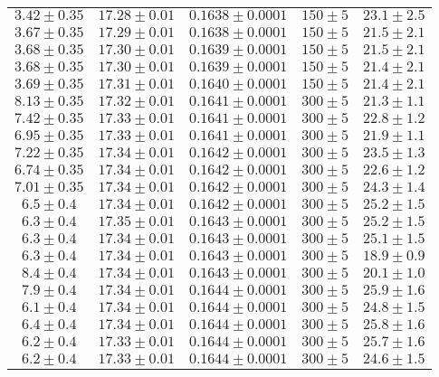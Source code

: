 \begin{table}
\begin{tabular}{c c c c c}
		$3.42\pm0.35$ & $17.28\pm0.01$ & $0.1638\pm0.0001$ & $150\pm5$ & $23.1\pm2.5$ \\
		$3.67\pm0.35$ & $17.29\pm0.01$ & $0.1638\pm0.0001$ & $150\pm5$ & $21.5\pm2.1$ \\
		$3.68\pm0.35$ & $17.30\pm0.01$ & $0.1639\pm0.0001$ & $150\pm5$ & $21.5\pm2.1$ \\
		$3.68\pm0.35$ & $17.30\pm0.01$ & $0.1639\pm0.0001$ & $150\pm5$ & $21.4\pm2.1$ \\
		$3.69\pm0.35$ & $17.31\pm0.01$ & $0.1640\pm0.0001$ & $150\pm5$ & $21.4\pm2.1$ \\
		$8.13\pm0.35$ & $17.32\pm0.01$ & $0.1641\pm0.0001$ & $300\pm5$ & $21.3\pm1.1$ \\
		$7.42\pm0.35$ & $17.33\pm0.01$ & $0.1641\pm0.0001$ & $300\pm5$ & $22.8\pm1.2$ \\
		$6.95\pm0.35$ & $17.33\pm0.01$ & $0.1641\pm0.0001$ & $300\pm5$ & $21.9\pm1.1$ \\
		$7.22\pm0.35$ & $17.34\pm0.01$ & $0.1642\pm0.0001$ & $300\pm5$ & $23.5\pm1.3$ \\
		$6.74\pm0.35$ & $17.34\pm0.01$ & $0.1642\pm0.0001$ & $300\pm5$ & $22.6\pm1.2$ \\
		$7.01\pm0.35$ & $17.34\pm0.01$ & $0.1642\pm0.0001$ & $300\pm5$ & $24.3\pm1.4$ \\
		$6.5\pm0.4$   & $17.34\pm0.01$ & $0.1642\pm0.0001$ & $300\pm5$ & $25.2\pm1.5$ \\
		$6.3\pm0.4$   & $17.35\pm0.01$ & $0.1643\pm0.0001$ & $300\pm5$ & $25.2\pm1.5$ \\
		$6.3\pm0.4$   & $17.34\pm0.01$ & $0.1643\pm0.0001$ & $300\pm5$ & $25.1\pm1.5$ \\
		$6.3\pm0.4$   & $17.34\pm0.01$ & $0.1643\pm0.0001$ & $300\pm5$ & $18.9\pm0.9$ \\
		$8.4\pm0.4$   & $17.34\pm0.01$ & $0.1643\pm0.0001$ & $300\pm5$ & $20.1\pm1.0$ \\
		$7.9\pm0.4$   & $17.34\pm0.01$ & $0.1644\pm0.0001$ & $300\pm5$ & $25.9\pm1.6$ \\
		$6.1\pm0.4$   & $17.34\pm0.01$ & $0.1644\pm0.0001$ & $300\pm5$ & $24.8\pm1.5$ \\
		$6.4\pm0.4$   & $17.34\pm0.01$ & $0.1644\pm0.0001$ & $300\pm5$ & $25.8\pm1.6$ \\
		$6.2\pm0.4$   & $17.33\pm0.01$ & $0.1644\pm0.0001$ & $300\pm5$ & $25.7\pm1.6$ \\
		$6.2\pm0.4$   & $17.33\pm0.01$ & $0.1644\pm0.0001$ & $300\pm5$ & $24.6\pm1.5$ \\

    \bottomrule
  \end{tabular}
\end{table}


